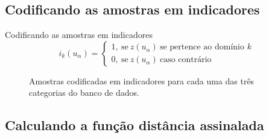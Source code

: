 \documentclass[aspectratio=169]{beamer}
\begin{document}
\subsection{Codificando as amostras em indicadores}

\begin{frame}{Codificando as amostras em indicadores}
	\begin{equation}
	i_k(u_\alpha)=\begin{cases}
	1,\:\textrm{se}\:z(u_\alpha)\:\textrm{se pertence ao domínio $k$}\\
	0,\:\textrm{se}\:z(u_\alpha)\:\textrm{caso contrário}\end{cases}
	\label{eq_ind}
	\end{equation}
	
	\begin{figure}[H]
		\caption{Amostras codificadas em indicadores para cada uma das três categorias do banco de dados.} \label{ind}
		\centering
	\end{figure}
\end{frame}

\subsection{Calculando a função distância assinalada}
\end{document}
